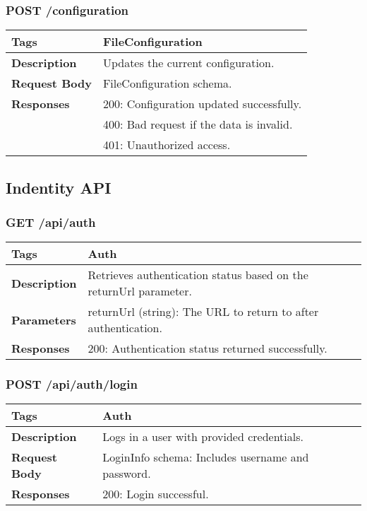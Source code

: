\subsubsection*{POST /configuration}
\begin{longtable}{|>{\raggedright\arraybackslash}p{3cm}|p{10cm}|}
\hline
\textbf{Tags} & FileConfiguration \\
\hline
\textbf{Description} & Updates the current configuration. \\
\hline
\textbf{Request Body} & FileConfiguration schema. \\
\hline
\textbf{Responses} & 200: Configuration updated successfully. \\
 & 400: Bad request if the data is invalid. \\
 & 401: Unauthorized access. \\
\hline
\end{longtable}

\subsection{Indentity API}

\subsubsection*{GET /api/auth}
\begin{longtable}{|>{\raggedright\arraybackslash}p{3cm}|p{10cm}|}
\hline
\textbf{Tags} & Auth \\
\hline
\textbf{Description} & Retrieves authentication status based on the returnUrl parameter. \\
\hline
\textbf{Parameters} & returnUrl (string): The URL to return to after authentication. \\
\hline
\textbf{Responses} & 200: Authentication status returned successfully. \\
\hline
\end{longtable}

\subsubsection*{POST /api/auth/login}
\begin{longtable}{|>{\raggedright\arraybackslash}p{3cm}|p{10cm}|}
\hline
\textbf{Tags} & Auth \\
\hline
\textbf{Description} & Logs in a user with provided credentials. \\
\hline
\textbf{Request Body} & LoginInfo schema: Includes username and password. \\
\hline
\textbf{Responses} & 200: Login successful. \\
\hline
\end{longtable}

